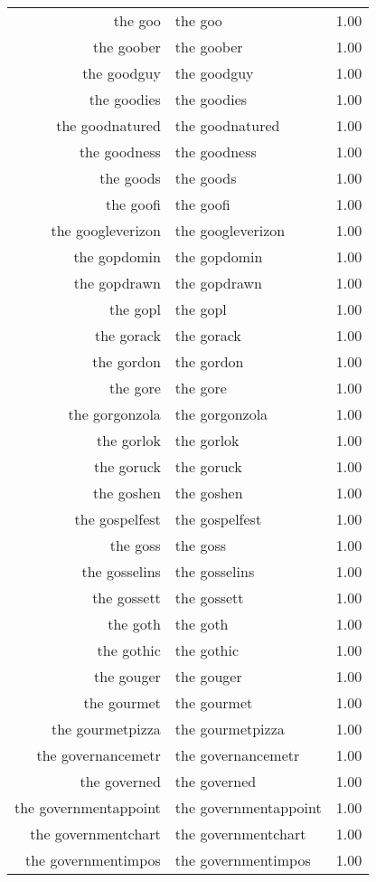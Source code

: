 \begin{table}[ht]
\begin{tabular}{rlr}
  the goo & the goo & 1.00 \\ 
  the goober & the goober & 1.00 \\ 
  the goodguy & the goodguy & 1.00 \\ 
  the goodies & the goodies & 1.00 \\ 
  the goodnatured & the goodnatured & 1.00 \\ 
  the goodness & the goodness & 1.00 \\ 
  the goods & the goods & 1.00 \\ 
  the goofi & the goofi & 1.00 \\ 
  the googleverizon & the googleverizon & 1.00 \\ 
  the gopdomin & the gopdomin & 1.00 \\ 
  the gopdrawn & the gopdrawn & 1.00 \\ 
  the gopl & the gopl & 1.00 \\ 
  the gorack & the gorack & 1.00 \\ 
  the gordon & the gordon & 1.00 \\ 
  the gore & the gore & 1.00 \\ 
  the gorgonzola & the gorgonzola & 1.00 \\ 
  the gorlok & the gorlok & 1.00 \\ 
  the goruck & the goruck & 1.00 \\ 
  the goshen & the goshen & 1.00 \\ 
  the gospelfest & the gospelfest & 1.00 \\ 
  the goss & the goss & 1.00 \\ 
  the gosselins & the gosselins & 1.00 \\ 
  the gossett & the gossett & 1.00 \\ 
  the goth & the goth & 1.00 \\ 
  the gothic & the gothic & 1.00 \\ 
  the gouger & the gouger & 1.00 \\ 
  the gourmet & the gourmet & 1.00 \\ 
  the gourmetpizza & the gourmetpizza & 1.00 \\ 
  the governancemetr & the governancemetr & 1.00 \\ 
  the governed & the governed & 1.00 \\ 
  the governmentappoint & the governmentappoint & 1.00 \\ 
  the governmentchart & the governmentchart & 1.00 \\ 
  the governmentimpos & the governmentimpos & 1.00 \\ 

\end{tabular}
\end{table}
